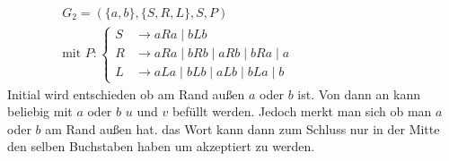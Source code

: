 \begin{align*}
	G_2=(\{a,b\},\{S,R,L\},S,P)&&&&&&&&&&&\\
	\text{mit }P:
	\begin{cases}
		S&\rightarrow aRa\mid bLb\\
		R&\rightarrow aRa\mid bRb\mid aRb\mid bRa\mid a\\
		L&\rightarrow aLa\mid bLb\mid aLb\mid bLa\mid b
	\end{cases}
\end{align*}
Initial wird entschieden ob am Rand außen $a$ oder $b$ ist. Von dann an kann beliebig mit $a$ oder $b$ $u$ und $v$ befüllt werden. Jedoch merkt man sich ob man $a$ oder $b$ am Rand außen hat. das Wort kann dann zum Schluss nur in der Mitte den selben Buchstaben haben um akzeptiert zu werden.